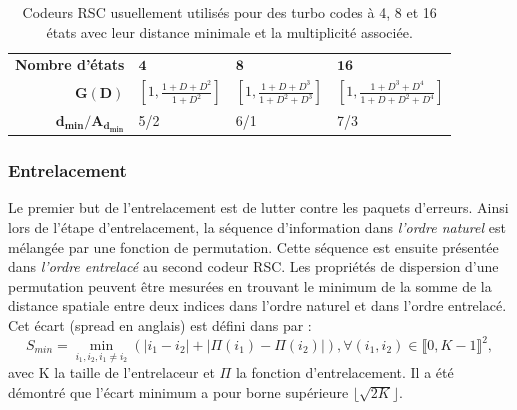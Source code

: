 \begin{table}[h]
	\centering
	\renewcommand{\arraystretch}{1.4}
	\begin{tabular}{rlll}
		\toprule
		\textbf{Nombre d'états}       & $\mathbf{4}$                           & $\mathbf{8}$                               & $\mathbf{16}$                                  \\ 
		\cmidrule(l){2-2} \cmidrule(l){3-3} \cmidrule(l){4-4}
		$\mathbf{G(D)}$                & $\left[1,\frac{1+D+D^2}{1+D^2}\right]$ & $\left[1,\frac{1+D+D^3}{1+D^2+D^3}\right]$ & $\left[1,\frac{1+D^3+D^4}{1+D+D^2+D^4}\right]$ \\
		$\mathbf{d_{min}/A_{d_{min}}}$ & 5/2                                    & 6/1                                        & 7/3                                            \\ \bottomrule
	\end{tabular}
	\caption{Codeurs RSC usuellement utilisés pour des turbo codes à 4, 8 et 16 états avec leur distance minimale et la multiplicité associée.}
	\label{tab:bestRSC}
\end{table}

\subsubsection{Entrelacement}\label{sec:entrelacement}
Le premier but de l'entrelacement est de lutter contre les paquets d'erreurs. Ainsi lors de l'étape d'entrelacement, la 
séquence d'information dans \emph{l'ordre naturel} est mélangée par une fonction de permutation. Cette séquence est ensuite 
présentée dans \emph{l'ordre entrelacé} au second codeur RSC. Les propriétés de dispersion d'une permutation peuvent être 
mesurées en trouvant le minimum de la somme de la distance spatiale entre deux indices dans l'ordre naturel et dans l'ordre 
entrelacé. Cet écart (spread en anglais) est défini dans \cite{crozier2000new} par : 
\[S_{min} = \min\limits_{i_1, i_2, i_1 \ne i_2} \left( |i_1 - i_2| + |\Pi(i_1) - \Pi(i_2)| \right), \forall (i_1, i_2) \in \llbracket 0, K-1 \rrbracket ^2, \]
avec K la taille de l'entrelaceur et $\Pi$ la fonction d'entrelacement. 
Il a été démontré \cite{crozier2000new} que l'écart minimum a pour borne supérieure $\lfloor{\sqrt{2K}}\rfloor $.

